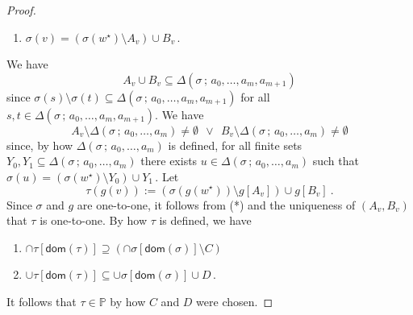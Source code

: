 \documentclass[10pt,a4paper, openany,  oldfontcommands]{memoir}
\newtheorem{open problem} [theorem] {Open Problem}
\begin{document}
\begin{proof}
\begin{enumerate}
\item   $   \sigma (v)  =   \left(    \sigma  \left(   w^{  \star }  \right)   \setminus  A_v  \right)   \cup   B_v        \,  $. 
\end{enumerate}
We have 
\[
 A_v   \cup   B_v  \subseteq   \Delta  \left(  \sigma  \,  ;  \,     a_0,  \ldots , a_m , a_{ m+1}  \right)  
 \]
 since  $  \sigma (s )  \setminus  \sigma (t)   \subseteq    \Delta  \left(  \sigma  \,  ;  \,     a_0,  \ldots , a_m , a_{ m+1}  \right)    $  
 for all $  s, t  \in   \Delta  \left(  \sigma  \,  ;  \,     a_0,  \ldots , a_m , a_{ m+1}  \right)    $. 
We have  
\[
 A_v  \setminus    \Delta  \left(  \sigma  \,  ;  \,     a_0,  \ldots , a_m  \right)     \neq   \emptyset   
 \      \      \vee       \        \  
 B_v  \setminus    \Delta  \left(  \sigma  \,  ;  \,     a_0,  \ldots , a_m   \right)    \neq   \emptyset 
 \tag{*}
\]
since, by how   $  \Delta  \left(  \sigma  \,  ;  \,     a_0,  \ldots , a_m   \right)     $   is defined, 
   for all  finite sets   $  Y_0,  Y_1    \subseteq   \Delta  \left(  \sigma  \,  ;  \,     a_0,  \ldots , a_m   \right)     $  there exists  
$  u  \in   \Delta  \left(  \sigma  \,  ;  \,     a_0,  \ldots , a_m   \right)     $  such that  
$  \sigma (u)  =   \left(    \sigma  \left(   w^{  \star }  \right)   \setminus  Y_0   \right)   \cup   Y_1        \,  $. 
Let  
\[
\tau  \left(   g(v) \right)   :=   
 \left(    \sigma  \left(   g \left( w^{  \star }   \right)   \right)   \setminus   g  \left[ A_v   \right]  \right)   \cup    g  \left[ B_v   \right]  
 \          .
\]
Since  $  \sigma $ and $g$   are  one-to-one, 
it follows from (*) and the uniqueness of $ (A_v, B_v ) $  that $  \tau $  is one-to-one. 
By  how  $  \tau $  is defined, we have 
\begin{enumerate}
\item   $  \cap   \tau  \left[   \mathsf{dom} \left(  \tau  \right)   \right]    \supseteq 
\left(  \cap   \sigma  \left[   \mathsf{dom} \left(  \sigma  \right)   \right]     \setminus  C   \right)  $


\item     $  \cup   \tau  \left[   \mathsf{dom} \left(  \tau  \right)   \right]    \subseteq 
\cup   \sigma  \left[   \mathsf{dom} \left(  \sigma  \right)   \right]     \cup   D     \,      $.
\end{enumerate}
It follows that   $  \tau  \in   \mathbb{P} $ by how $C$ and $D$ were chosen. 




\end{proof}
\end{document}
